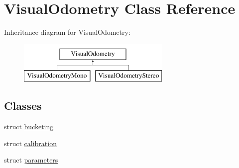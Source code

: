 \hypertarget{class_visual_odometry}{\section{Visual\+Odometry Class Reference}
\label{class_visual_odometry}
}
Inheritance diagram for Visual\+Odometry\+:\begin{figure}[H]
\begin{center}
\leavevmode
\includegraphics[height=2.000000cm]{class_visual_odometry}
\end{center}
\end{figure}
\subsection*{Classes}
\begin{DoxyCompactItemize}
\item 
struct \hyperlink{struct_visual_odometry_1_1bucketing}{bucketing}
\item 
struct \hyperlink{struct_visual_odometry_1_1calibration}{calibration}
\item 
struct \hyperlink{struct_visual_odometry_1_1parameters}{parameters}
\end{DoxyCompactItemize}
